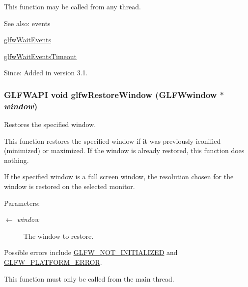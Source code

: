 This function may be called from any thread.

\begin{Desc}
\item[See also:]events 

\hyperlink{group__window_g6e042d05823c11e11c7339b81a237738}{glfwWaitEvents} 

\hyperlink{group__window_g05223a0a4c5e50f10f289e60398153aa}{glfwWaitEventsTimeout}\end{Desc}
\begin{Desc}
\item[Since:]Added in version 3.1. \end{Desc}
\hypertarget{group__window_g1e29caf0b819f578b04db52fff17256c}{
\subsubsection[glfwRestoreWindow]{\setlength{\rightskip}{0pt plus 5cm}GLFWAPI void glfwRestoreWindow ({\bf GLFWwindow} $\ast$ {\em window})}}
\label{group__window_g1e29caf0b819f578b04db52fff17256c}


Restores the specified window. 

This function restores the specified window if it was previously iconified (minimized) or maximized. If the window is already restored, this function does nothing.

If the specified window is a full screen window, the resolution chosen for the window is restored on the selected monitor.

\begin{Desc}
\item[Parameters:]
\begin{description}
\item[\mbox{$\leftarrow$} {\em window}]The window to restore.\end{description}
\end{Desc}
Possible errors include \hyperlink{group__errors_g2374ee02c177f12e1fa76ff3ed15e14a}{GLFW\_\-NOT\_\-INITIALIZED} and \hyperlink{group__errors_gd44162d78100ea5e87cdd38426b8c7a1}{GLFW\_\-PLATFORM\_\-ERROR}.

This function must only be called from the main thread.

